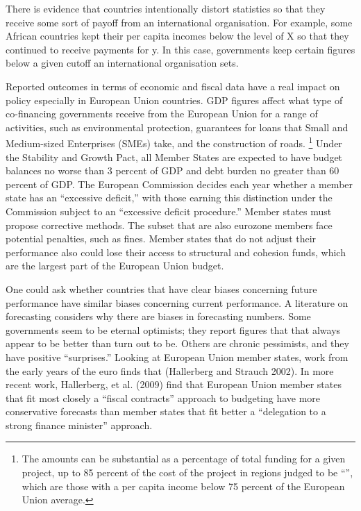 \documentclass[]{article}
\begin{document}
There is evidence that countries intentionally distort statistics so that they receive some sort of payoff from an international organisation. For example, some African countries kept their per capita incomes below the level of X so that they continued to receive payments for y.  In this case, governments keep certain figures below a given cutoff an international organisation sets.

Reported outcomes in terms of economic and fiscal data have a real impact on policy especially in European Union countries. GDP figures affect what type of co-financing governments receive from the European Union for a range of activities, such as environmental protection, guarantees for loans that Small and Medium-sized Enterprises (SMEs) take, and the construction of roads. \footnote{The amounts can be substantial as a percentage of total funding for a given project, up to 85 percent of the cost of the project in regions judged to be “”, which are those with a per capita income below 75 percent of the European Union average.} Under the Stability and Growth Pact, all Member States are expected to have budget balances no worse than 3 percent of GDP and debt burden no greater than 60 percent of GDP. The European Commission decides each year whether a member state has an “excessive deficit,” with those earning this distinction under the Commission subject to an “excessive deficit procedure.” Member states must propose corrective methods. The subset that are also eurozone members face potential penalties, such as fines. Member states that do not adjust their performance also could lose their access to structural and cohesion funds, which are the largest part of the European Union budget.

One could ask whether countries that have clear biases concerning future performance have similar biases concerning current performance. A literature on forecasting considers why there are biases in forecasting numbers. Some governments seem to be eternal optimists; they report figures that that always appear to be better than turn out to be. Others are chronic pessimists, and they have positive “surprises.” Looking at European Union member states, work from the early years of the euro finds that (Hallerberg and Strauch 2002). In more recent work, Hallerberg, et al. (2009) find that European Union member states that fit most closely a “fiscal contracts” approach to budgeting have more conservative forecasts than member states that fit better a “delegation to a strong finance minister” approach.
\end{document}
